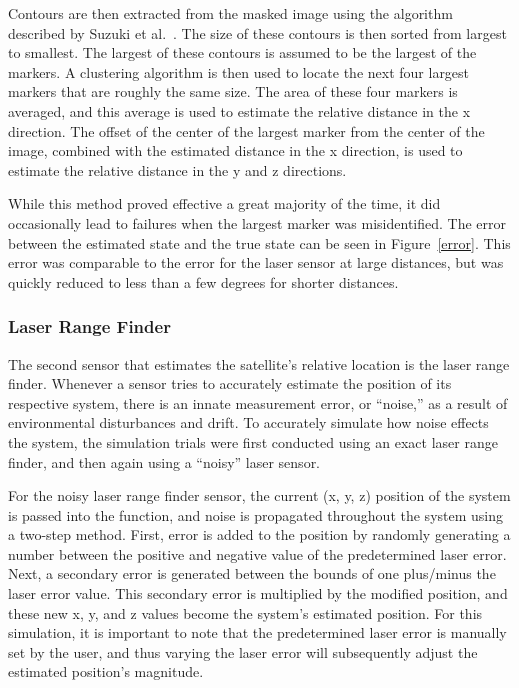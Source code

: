 \documentclass[journal, 10pt]{IEEEtran}
\begin{document}
Contours are then extracted from the masked image using the algorithm described by Suzuki et al.~\cite{suzuki1985topological}. The size of these contours is then sorted from largest to smallest. The largest of these contours is assumed to be the largest of the markers. A clustering algorithm is then used to locate the next four largest markers that are roughly the same size. The area of these four markers is averaged, and this average is used to estimate the relative distance in the x direction. The offset of the center of the largest marker from the center of the image, combined with the estimated distance in the x direction, is used to estimate the relative distance in the y and z directions.

While this method proved effective a great majority of the time, it did occasionally lead to failures when the largest marker was misidentified. The error between the estimated state and the true state can be seen in Figure~\ref{error}. This error was comparable to the error for the laser sensor at large distances, but was quickly reduced to less than a few degrees for shorter distances.

\subsubsection{Laser Range Finder} \label{laser}
The second sensor that estimates the satellite's relative location is the laser range finder. Whenever a sensor tries to accurately estimate the position of its respective system, there is an innate measurement error, or ``noise,'' as a result of environmental disturbances and drift. To accurately simulate how noise effects the system, the simulation trials were first conducted using an exact laser range finder, and then again using a ``noisy'' laser sensor. 

For the noisy laser range finder sensor, the current (x, y, z) position of the system is passed into the function, and noise is propagated throughout the system using a two-step method. First, error is added to the position by randomly generating a number between the positive and negative value of the predetermined laser error. Next, a secondary error is generated between the bounds of one plus/minus the laser error value. This secondary error is multiplied by the modified position, and these new x, y, and z values become the system's estimated position.  For this simulation, it is important to note that the predetermined laser error is manually set by the user, and thus varying the laser error will subsequently adjust the estimated position's magnitude. 
\end{document}
